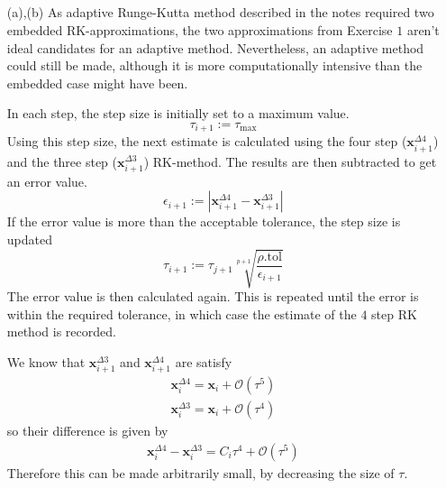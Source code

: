 \documentclass{article}
\begin{document}
\subsection{}
\begin{itemize}
	\item[(a),(b)]
		As adaptive Runge-Kutta method described in the notes required
		two embedded RK-approximations, the two approximations from
		Exercise $1$ aren't ideal candidates for an adaptive method.
		Nevertheless, an adaptive method could still be made, although it
		is more computationally intensive than the embedded case might
		have been.

		In each step, the step size is initially set to a maximum value.
		\[
			\tau_{i+1} := \tau_{\text{max}}
		\]
		Using this step size, the next estimate is calculated using the
		four step ($\mathbf{x}_{i+1}^{\Delta 4}$) and the three step
		($\mathbf{x}_{i+1}^{\Delta 3}$) RK-method. The results are then
		subtracted to get an error value.
		\[
			\epsilon_{i + 1} := |\mathbf{x}_{i+1}^{\Delta 4} -
			\mathbf{x}_{i+1}^{\Delta 3}|
		\]
		If the error value is more than the acceptable tolerance, the
		step size is updated
		\[
			\tau_{i+1}:= \tau_{j+1} \sqrt[p+1]{\frac{\rho.
			\text{tol}}{\epsilon_{i + 1}}}
		\]
		The error value is then calculated again.  This is repeated
		until the error is within the required tolerance, in which case
		the estimate of the $4$ step RK method is recorded.

		We know that $\mathbf{x}_{i+1}^{\Delta 3}$ and
		$\mathbf{x}_{i+1}^{\Delta 4}$ are satisfy
		\begin{align*}
			\mathbf{x}_{i}^{\Delta 4} = \mathbf{x}_{i} +
			\mathcal{O}(\tau^5) \\
			\mathbf{x}_{i}^{\Delta 3} = \mathbf{x}_{i} +
			\mathcal{O}(\tau^4)
		\end{align*}
		so their difference is given by
		\begin{align*}
			\mathbf{x}_{i}^{\Delta 4} - \mathbf{x}_{i}^{\Delta 3} =
			C_i \tau^4 + \mathcal{O}(\tau^5)
		\end{align*}
		Therefore this can be made arbitrarily small, by decreasing the
		size of $\tau$.


\end{itemize}
\end{document}
